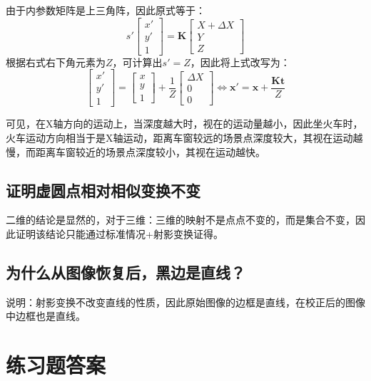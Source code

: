 \documentclass[11pt]{article}
\begin{document}
由于内参数矩阵是上三角阵，因此原式等于：
\begin{equation*}
  s'\begin{bmatrix}
    x' \\y'\\1
  \end{bmatrix}=\mathbf{K}\begin{bmatrix}
    X+\Delta X \\Y\\Z
  \end{bmatrix}
\end{equation*}
根据右式右下角元素为$Z$，可计算出$s'=Z$，因此将上式改写为：
\begin{equation*}
  \begin{bmatrix}
    x' \\y'\\1
  \end{bmatrix}=\begin{bmatrix}
    x \\y\\1
  \end{bmatrix}+\frac{1}{Z}\begin{bmatrix}
    \Delta X \\0\\0
  \end{bmatrix}\Leftrightarrow\mathbf{x}'=\mathbf{x}+\frac{\mathbf{Kt}}{Z}
\end{equation*}\par
可见，在X轴方向的运动上，当深度越大时，视在的运动量越小，因此坐火车时，火车运动方向相当于是X轴运动，距离车窗较远的场景点深度较大，其视在运动越慢，而距离车窗较近的场景点深度较小，其视在运动越快。
\subsection{证明虚圆点相对相似变换不变}
二维的结论是显然的，对于三维：三维的映射不是点点不变的，而是集合不变，因此证明该结论只能通过标准情况+射影变换证得。
\subsection{为什么从图像恢复后，黑边是直线？}
说明：射影变换不改变直线的性质，因此原始图像的边框是直线，在校正后的图像中边框也是直线。
\section{练习题答案}
\end{document}
